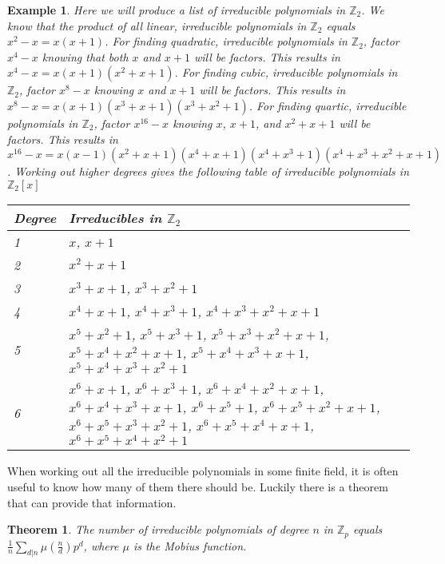 \documentclass{article}
\newtheorem*{Definition: Sylvester Matrix}{Definition}
\newtheorem*{Definition: Resultant 1}{Definition 1}
\newtheorem*{Definition: Resultant 2}{Definition 2}
\newtheorem*{Theorem: Resultant proves shared roots}{Theorem 1}
\newtheorem*{Theorem: Minimal polynomial for beta}{Theorem 2}
\newtheorem*{Example: Sylvester Matrix Ex}{Example}
\newtheorem*{Theorem: Roots}{Theorem}
\newtheorem*{Corollary: Discriminant}{Corollary}
\newtheorem*{Theorem: Rational Root Theorem}{Theorem}
\newtheorem*{Corollary: Cubic Irreducibility}{Corollary}
\newtheorem*{Theorem: Eisenstein Criterion}{Theorem}
\newtheorem*{Theorem: mod p Test}{Theorem}
\newtheorem*{Theorem: Rabin's algorithm}{Theorem}
\newtheorem*{Theorem: gcd finite field}{Theorem}
\newtheorem*{Theorem: Gauss Irreducibles}{Theorem}
\newtheorem*{Theorem: Number of irreducibles}{Theorem}
\newtheorem*{Example: All irreducibles in Z_2}{Example}
\newtheorem*{Formula: Minimal polynomial for r root of a}{Formula 1}
\newtheorem*{Example: minimal polynomial for sqrt(p)}{Example}
\newtheorem*{Example: Golden Ratio}{Example}
\newtheorem*{Formula: Minimal polynomial for a+b}{Formula 2}
\newtheorem*{Example: 1 + sqrt(3)}{Example}
\newtheorem*{Example: cubic root of unity}{Example}
\newtheorem*{Formula: Minimal polynomial for a/b}{Formula 3}
\newtheorem*{Formula: Minimal polynomial for ab}{Formula 4}
\newtheorem*{Example: cubrt(4)/i+1}{Example}
\newtheorem*{Example: 5zeta}{Example}
\newtheorem*{Example: Wild one}{Example}
\begin{document}
\begin{Example: All irreducibles in Z_2}
Here we will produce a list of irreducible polynomials in $\mathbb{Z}_2$.  We know that the product of all linear, irreducible polynomials in $\mathbb{Z}_2$ equals $x^2-x=x(x+1)$. For finding quadratic, irreducible polynomials in $\mathbb{Z}_2$, factor $x^4-x$ knowing that both $x$ and $x+1$ will be factors. This results in $x^4-x = x(x+1)(x^2+x+1)$. For finding cubic, irreducible polynomials in $\mathbb{Z}_2$, factor $x^8-x$ knowing $x$ and $x+1$ will be factors. This results in $x^8-x=x(x+1)(x^3+x+1)(x^3+x^2+1)$. For finding quartic, irreducible polynomials in $\mathbb{Z}_2$, factor $x^{16}-x$ knowing $x$, $x+1$, and $x^2+x+1$ will be factors. This results in $x^{16}-x=x(x-1)(x^2+x+1)(x^4+x+1)(x^4+x^3+1)(x^4+x^3+x^2+x+1)$. Working out higher degrees gives the following table of irreducible polynomials in $\mathbb{Z}_2[x]$
\begin{center}
 \begin{tabular}{ | m{3em} | m{7cm}| } 
 \hline
 Degree & Irreducibles in $\mathbb{Z}_2$ \\
 \hline\hline
 1 & $x$, $x+1$  \\ 
 \hline
 2 & $x^2+x+1$  \\
 \hline
 3 & $x^3+x+1$, $x^3+x^2+1$ \\
 \hline
 4 & $x^4+x+1$, $x^4+x^3+1$, $x^4+x^3+x^2+x+1$ \\
 \hline
 5 & $x^5+x^2+1$, $x^5+x^3+1$, $x^5+x^3+x^2+x+1$, $x^5+x^4+x^2+x+1$, $x^5+x^4+x^3+x+1$, $x^5+x^4+x^3+x^2+1$  \\ 
 \hline
  6 & $x^6+x+1$, $x^6+x^3+1$, $x^6+x^4+x^2+x+1$, $x^6+x^4+x^3+x+1$, $x^6+x^5+1$, $x^6+x^5+x^2+x+1$, $x^6+x^5+x^3+x^2+1$, $x^6+x^5+x^4+x+1$, $x^6+x^5+x^4+x^2+1$  \\ 
 \hline
\end{tabular}
\end{center}
\end{Example: All irreducibles in Z_2}

When working out all the irreducible polynomials in some finite field, it is often useful to know how many of them there should be. Luckily there is a theorem that can provide that information. 

\begin{Theorem: Number of irreducibles}
The number of irreducible polynomials of degree $n$ in $\mathbb{Z}_p$ equals $\displaystyle \frac{1}{n}\sum_{d|n}\mu(\frac{n}{d})p^d$, where $\mu$ is the Mobius function. \cite{Childs A Concrete Introduction to Higher Algebra}
\end{Theorem: Number of irreducibles}
\end{document}
